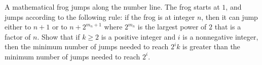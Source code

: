A mathematical frog jumps along the number line. The frog starts at $1$,  and jumps according to the following rule: if the frog is at integer $n$,  then it can jump either to $n+1$ or to $n + 2^{m_n+1}$ where $2^{m_n}$ is the largest power of $2$ that is a factor of $n.$ Show that if $k \geq 2$ is a positive integer and $i$ is a nonnegative integer, then the minimum number of jumps needed to reach $2^ik$ is greater than the minimum number of jumps needed to reach $2^i.$